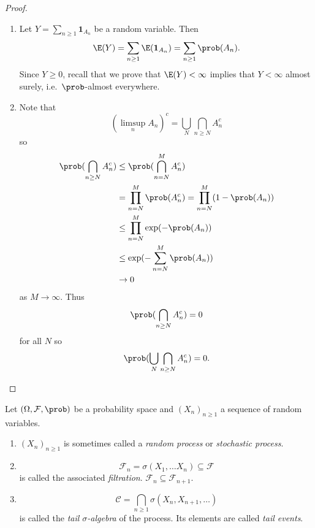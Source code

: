 \documentclass[a4paper]{article}
\renewcommand{\P}{\prob} %
\begin{document}
\begin{proof}\leavevmode
  \begin{enumerate}
  \item Let \(Y = \sum_{n \geq 1} \mathbf 1_{A_n}\) be a random variable. Then
    \[
      \E(Y) = \sum_{n \geq 1} \E(\mathbf 1_{A_n}) = \sum_{n \geq 1} \P(A_n).
    \]
    Since \(Y \geq 0\), recall that we prove that \(\E(Y) < \infty\) implies that \(Y < \infty\) almost surely, i.e.\ \(\P\)-almost everywhere.
  \item Note that
    \[
      (\limsup_n A_n)^c = \bigcup_N \bigcap_{n \geq N} A_n^c
    \]
    so
    \begin{align*}
      \P(\bigcap_{n \geq N} A_n^c)
      &\leq \P(\bigcap_{n = N}^M A_n^c) \\
      &= \prod_{n = N}^M \P(A_n^c)
      = \prod_{n = N}^M (1 - \P(A_n)) \\
      &\leq \prod_{n = N}^M \exp (-\P(A_n)) \\
      &\leq \exp (- \sum_{n = N}^M \P(A_n)) \\
      &\to 0
    \end{align*}
    as \(M \to \infty\). Thus
    \[
      \P(\bigcap_{n \geq N} A_n^c) = 0
    \]
    for all \(N\) so
    \[
      \P(\bigcup_N \bigcap_{n \geq N} A_n^c) = 0.
    \]
  \end{enumerate}
\end{proof}

\begin{definition}
  Let \((\Omega, \mathcal F, \P)\) be a probability space and \((X_n)_{n \geq 1}\) a sequence of random variables.
  \begin{enumerate}
  \item \((X_n)_{n \geq 1}\) is sometimes called a \emph{random process} or \emph{stochastic process}.
  \item
    \[
      \mathcal F_n = \sigma(X_1, \dots X_n) \subseteq \mathcal F
    \]
    is called the associated \emph{filtration}. \(\mathcal F_n \subseteq \mathcal F_{n + 1}\).
  \item
    \[
      \mathcal C = \bigcap_{n \geq 1} \sigma(X_n, X_{n + 1}, \dots)
    \]
    is called the \emph{tail \(\sigma\)-algebra} of the process. Its elements are called \emph{tail events}.
  \end{enumerate}
\end{definition}
\end{document}
